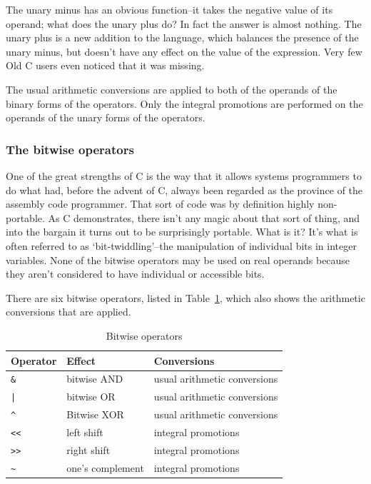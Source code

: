     The unary minus has an obvious function--it takes the negative
     value of its operand; what does the unary plus do? In fact the answer is
     almost nothing. The unary plus is a new addition to the language, which
     balances the presence of the unary minus, but doesn't have any effect on
     the value of the expression. Very few Old C users even noticed that
     it was missing.


    The usual arithmetic conversions are applied to both of the operands of
     the binary forms of the operators. Only the integral promotions are
     performed on the operands of the unary forms of the operators.


   

   \subsubsection{The bitwise operators}
    

    One of the great strengths of C is the way that it allows systems
     programmers to do what had, before the advent of C, always been
     regarded as the province of the assembly code programmer. That sort of
     code was by definition highly non-portable. As C demonstrates, there
     isn't any magic about that sort of thing, and into the bargain it turns
     out to be surprisingly portable. What is it? It's what is often referred
     to as `bit-twiddling'--the manipulation of individual bits in
     integer variables. None of the bitwise operators may be used on real
     operands because they aren't considered to have individual or accessible
     bits.


    There are six bitwise operators, listed in Table~\ref{tab:bitwiseOps},
     which also shows the arithmetic conversions that are applied.


     \begin{table}[htb]
       \centering
       \begin{tabular}{lll}
         \toprule
         Operator      & Effect           & Conversions     \\
         \midrule
         \texttt{\&}   & bitwise AND      & usual arithmetic conversions     \\
         \texttt{|}    & bitwise OR       & usual arithmetic conversions     \\
         \texttt{\^}   & Bitwise XOR      & usual arithmetic conversions     \\
         \texttt{<{}<} & left shift       & integral promotions     \\
         \texttt{>{}>} & right shift      & integral promotions     \\
         \texttt{\~}   & one's complement & integral promotions     \\
         \bottomrule
       \end{tabular}
       \caption{\label{tab:bitwiseOps}Bitwise operators}
     \end{table}


